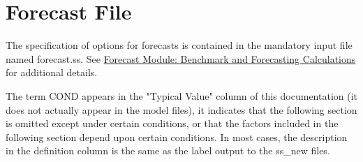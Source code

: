 \section{Forecast File}
The specification of options for forecasts is contained in the mandatory input file named forecast.ss.  See \hyperref[sec:forecast]{Forecast Module: Benchmark and Forecasting Calculations} for additional details. 

The term COND appears in the "Typical Value" column of this documentation (it does not actually appear in the model files), it indicates that the following section is omitted except under certain conditions, or that the factors included in the following section depend upon certain conditions. In most cases, the description in the definition column is the same as the label output to the ss\_new files.


